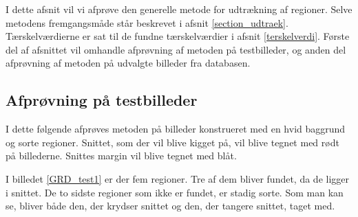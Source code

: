 
{\sffamily I dette afsnit vil vi afprøve den generelle metode for udtrækning af
regioner. Selve metodens fremgangsmåde står beskrevet i afsnit
\ref{section_udtraek}. Tærskelværdierne er sat til de fundne
tærskelværdier i afsnit \ref{terskelverdi}. Første del af afsnittet vil
omhandle afprøvning af metoden på testbilleder, og anden del afprøvning
af metoden på udvalgte billeder fra databasen.}

\subsection{Afprøvning på testbilleder}
I dette følgende afprøves metoden på billeder konstrueret med en hvid
baggrund og sorte regioner. Snittet, som der vil blive kigget på, vil
blive tegnet med rødt på billederne. Snittes margin vil blive tegnet med blåt.

I billedet \ref{GRD_test1} er der fem regioner. Tre af dem bliver
fundet, da de ligger i snittet. De to sidste regioner som ikke er fundet, er
stadig sorte. Som man kan se, bliver både den, der krydser snittet og den,
der tangere snittet, taget med. 

\begin{figure}[!h]
    \centering
    	\hspace{1em}
		\hspace{1em}
        \caption[]{}
     \label{GRD_test1_sammen}
\end{figure}

